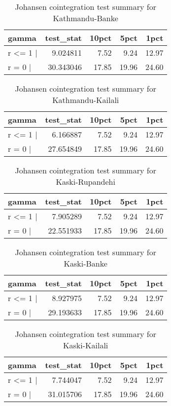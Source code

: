 \documentclass[
  12pt,
]{article}
\begin{document}
\begin{longtable}[t]{lrrrr}
\caption{\label{tab:rice-cajo-test}Johansen cointegration test summary for Kathmandu-Banke}\\
\toprule
gamma & test\_stat & 10pct & 5pct & 1pct\\
\midrule
r <= 1 | & 9.024811 & 7.52 & 9.24 & 12.97\\
r = 0  | & 30.343046 & 17.85 & 19.96 & 24.60\\
\bottomrule
\end{longtable}

\begin{longtable}[t]{lrrrr}
\caption{\label{tab:rice-cajo-test}Johansen cointegration test summary for Kathmandu-Kailali}\\
\toprule
gamma & test\_stat & 10pct & 5pct & 1pct\\
\midrule
r <= 1 | & 6.166887 & 7.52 & 9.24 & 12.97\\
r = 0  | & 27.654849 & 17.85 & 19.96 & 24.60\\
\bottomrule
\end{longtable}

\begin{longtable}[t]{lrrrr}
\caption{\label{tab:rice-cajo-test}Johansen cointegration test summary for Kaski-Rupandehi}\\
\toprule
gamma & test\_stat & 10pct & 5pct & 1pct\\
\midrule
r <= 1 | & 7.905289 & 7.52 & 9.24 & 12.97\\
r = 0  | & 22.551933 & 17.85 & 19.96 & 24.60\\
\bottomrule
\end{longtable}

\begin{longtable}[t]{lrrrr}
\caption{\label{tab:rice-cajo-test}Johansen cointegration test summary for Kaski-Banke}\\
\toprule
gamma & test\_stat & 10pct & 5pct & 1pct\\
\midrule
r <= 1 | & 8.927975 & 7.52 & 9.24 & 12.97\\
r = 0  | & 29.193633 & 17.85 & 19.96 & 24.60\\
\bottomrule
\end{longtable}

\begin{longtable}[t]{lrrrr}
\caption{\label{tab:rice-cajo-test}Johansen cointegration test summary for Kaski-Kailali}\\
\toprule
gamma & test\_stat & 10pct & 5pct & 1pct\\
\midrule
r <= 1 | & 7.744047 & 7.52 & 9.24 & 12.97\\
r = 0  | & 31.015706 & 17.85 & 19.96 & 24.60\\
\bottomrule
\end{longtable}
\end{document}
